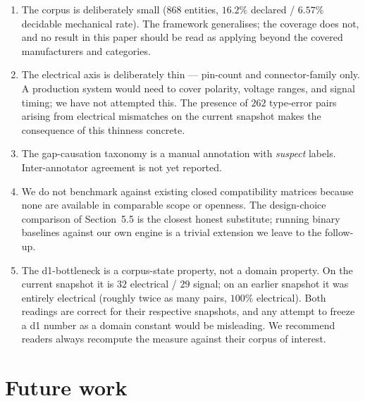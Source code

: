 \documentclass[review]{elsarticle}
\begin{document}
\begin{enumerate}[nosep]
\item The corpus is deliberately small ($868$ entities, $16.2\%$
declared / $6.57\%$ decidable mechanical rate). The framework
generalises; the coverage does not, and no result in this paper
should be read as applying beyond the covered manufacturers and
categories.

\item The electrical axis is deliberately thin --- pin-count and
connector-family only. A production system would need to cover
polarity, voltage ranges, and signal timing; we have not attempted
this. The presence of $262$ type-error pairs arising from
electrical mismatches on the current snapshot makes the
consequence of this thinness concrete.

\item The gap-causation taxonomy is a manual annotation with
\emph{suspect} labels. Inter-annotator agreement is not yet reported.

\item We do not benchmark against existing closed compatibility
matrices because none are available in comparable scope or openness.
The design-choice comparison of Section~5.5 is the closest honest
substitute; running binary baselines against our own engine is a
trivial extension we leave to the follow-up.

\item The d1-bottleneck is a corpus-state property, not a domain
property. On the current snapshot it is $32$ electrical / $29$
signal; on an earlier snapshot it was entirely electrical (roughly
twice as many pairs, $100\%$ electrical). Both readings are correct
for their respective snapshots, and any attempt to freeze a d1
number as a domain constant would be misleading. We recommend
readers always recompute the measure against their corpus of
interest.
\end{enumerate}

\section{Future work}
\end{document}

